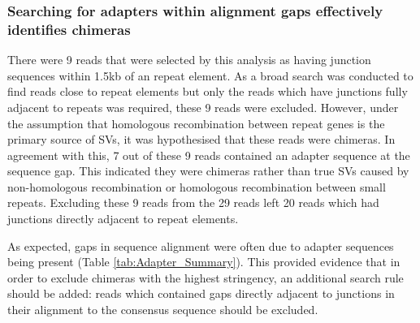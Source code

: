 \documentclass{article}
\begin{document}
\begin{table}[]
\caption{A table of worked examples of chimera matching based on the UK54 clone 4 dataset}
\label{tab:Homo_example}
\end{table}

\subsubsection{Searching for adapters within alignment gaps effectively identifies chimeras}

There were 9 reads that were selected by this analysis as having junction sequences within 1.5kb of an repeat element. As a broad search was conducted to find reads close to repeat elements but only the reads which have junctions fully adjacent to repeats was required, these 9 reads were excluded. However, under the assumption that homologous recombination between repeat genes is the primary source of SVs, it was hypothesised that these reads were chimeras. In agreement with this,  7 out of these 9 reads contained an adapter sequence at the sequence gap. This indicated they were chimeras rather than true SVs caused by non-homologous recombination or homologous recombination between small repeats. Excluding these 9 reads from the 29 reads left 20 reads which had junctions directly adjacent to repeat elements.


As expected, gaps in sequence alignment were often due to adapter sequences being present (Table \ref{tab:Adapter_Summary}). This provided evidence that in order to exclude chimeras with the highest stringency, an additional search rule should be added: reads which contained gaps directly adjacent to junctions in their alignment to the consensus sequence should be excluded. 
\end{document}

